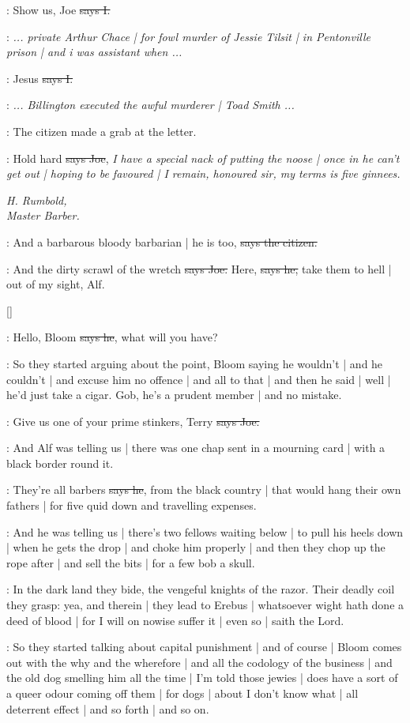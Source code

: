 :
Show us,
Joe
\sout{says I.}

\joe:
\emph{...
private Arthur Chace |
for fowl murder of Jessie Tilsit |
in Pentonville prison |
and i was assistant when ...}

:
Jesus
\sout{says I.}

\joe:
\emph{...
Billington executed the awful murderer |
Toad Smith ...}

\Nq:
The citizen made a grab at the letter.

\joe:
Hold hard
\sout{says Joe},
\emph{I have a special nack of putting the noose |
once in he can't get out |
hoping to be favoured |
I remain,
honoured sir,
my terms is five ginnees.}

\emph{%
H. Rumbold, \\
Master Barber.}

\citizen:
And a barbarous bloody barbarian |
he is too,
\sout{says the citizen.}

\joe:
And the dirty scrawl of the wretch
\sout{says Joe.}
Here,
\sout{says he,} take them to hell |
out of my sight,
Alf.

[]

\joe:
Hello,
Bloom
\sout{says he},
what will you have?

\Nq:
So they started arguing about the point,
Bloom saying he wouldn't |
and he couldn't |
and excuse him no offence |
and all to that |
and then he said |
well |
he'd just take a cigar.
Gob,
he's a prudent member |
and no mistake.

\joe:
Give us one of your prime stinkers,
Terry
\sout{says Joe.}

\Nq:
And Alf was telling us |
there was one chap sent in a mourning card |
with a black border
round it.

\bergan:
They're all barbers
\sout{says he},
from the black country |
that would hang their own fathers |
for five quid down and travelling expenses.

\Nq:
And he was telling us |
there's two fellows waiting below |
to pull his heels down |
when he gets the drop |
and choke him properly |
and then they chop up the rope after |
and sell the bits |
for a few bob a skull.

:
In the dark land they bide,
the vengeful knights of the razor.
Their deadly coil they grasp:
yea,
and therein |
they lead to Erebus |
whatsoever wight hath done a deed of blood |
for I will on nowise suffer it |
even so |
saith the Lord.

\Nq:
So they started talking about capital punishment |
and of course |
Bloom comes out with the why and the wherefore |
and all the codology of the business |
and the old dog smelling him all the time |
I'm told those jewies |
does have a sort of a queer odour coming off them |
for dogs |
about I don't know what |
all deterrent effect |
and so forth |
and so on.

